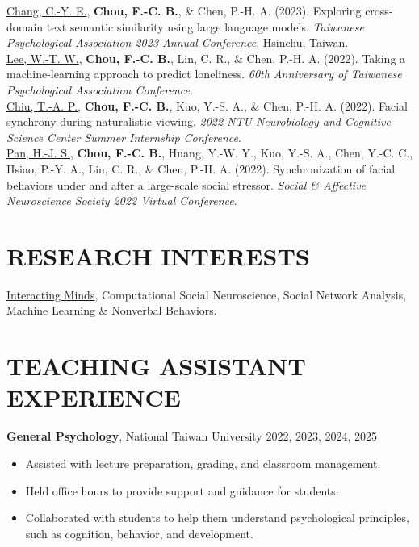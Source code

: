 \documentclass[a4paper,12pt]{article}
\newcommand{\sectionspace}{0pt} %
\newcommand{\itemspace}{7pt} %
\begin{document}
\noindent \underline{Chang, C.-Y. E.}, \textbf{Chou, F.-C. B.}, \& Chen, P.-H. A. (2023). Exploring cross-domain text semantic similarity using large language models. \textit{Taiwanese Psychological Association 2023 Annual Conference}, Hsinchu, Taiwan.\\[\itemspace]
\noindent \underline{Lee, W.-T. W.}, \textbf{Chou, F.-C. B.}, Lin, C. R., \& Chen, P.-H. A. (2022). Taking a machine-learning approach to predict loneliness. \textit{60th Anniversary of Taiwanese Psychological Association Conference}.\\[\itemspace]
\noindent \underline{Chiu, T.-A. P.}, \textbf{Chou, F.-C. B.}, Kuo, Y.-S. A., \& Chen, P.-H. A. (2022). Facial synchrony during naturalistic viewing. \textit{2022 NTU Neurobiology and Cognitive Science Center Summer Internship Conference}.\\[\itemspace]
\noindent \underline{Pan, H.-J. S.}, \textbf{Chou, F.-C. B.}, Huang, Y.-W. Y., Kuo, Y.-S. A., Chen, Y.-C. C., Hsiao, P.-Y. A., Lin, C. R., \& Chen, P.-H. A. (2022). Synchronization of facial behaviors under and after a large-scale social stressor. \textit{Social \& Affective Neuroscience Society 2022 Virtual Conference}.\\[\itemspace]

\vspace{\sectionspace}

\section*{RESEARCH INTERESTS}
\href{https://www.interactingminds.com}{Interacting Minds}, Computational Social Neuroscience, Social Network Analysis, Machine Learning \& Nonverbal Behaviors. \\[\sectionspace]

\vspace{\sectionspace}

\section*{TEACHING ASSISTANT EXPERIENCE}

\noindent\textbf{General Psychology}, National Taiwan University  \hfill 2022, 2023, 2024, 2025
\begin{itemize}
    \item Assisted with lecture preparation, grading, and classroom management.
    \item Held office hours to provide support and guidance for students.
    \item Collaborated with students to help them understand psychological principles, such as cognition, behavior, and development.
\end{itemize}
\end{document}
